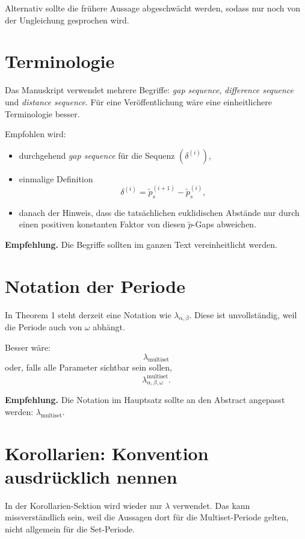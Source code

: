 \documentclass[11pt]{article}
\newcommand{\todo}[1]{\par\medskip\noindent\textbf{Empfehlung.} #1\par\medskip}
\begin{document}
Alternativ sollte die frühere Aussage abgeschwächt werden, sodass nur noch von der Ungleichung gesprochen wird.

\section{Terminologie}

Das Manuskript verwendet mehrere Begriffe: \emph{gap sequence}, \emph{difference sequence} und \emph{distance sequence}. Für eine Veröffentlichung wäre eine einheitlichere Terminologie besser.

Empfohlen wird:

\begin{itemize}[leftmargin=2em]
    \item durchgehend \emph{gap sequence} für die Sequenz \((\delta^{(i)})\),
    \item einmalige Definition
    \[
        \delta^{(i)}=\tilde p_s^{(i+1)}-\tilde p_s^{(i)},
    \]
    \item danach der Hinweis, dass die tatsächlichen euklidischen Abstände nur durch einen positiven konstanten Faktor von diesen \(\tilde p\)-Gaps abweichen.
\end{itemize}

\todo{Die Begriffe sollten im ganzen Text vereinheitlicht werden.}

\section{Notation der Periode}

In Theorem 1 steht derzeit eine Notation wie \(\lambda_{\alpha,\beta}\). Diese ist unvollständig, weil die Periode auch von \(\omega\) abhängt.

Besser wäre:
\[
    \lambda_{\mathrm{multiset}}
\]
oder, falls alle Parameter sichtbar sein sollen,
\[
    \lambda^{\mathrm{multiset}}_{\alpha,\beta,\omega}.
\]

\todo{Die Notation im Hauptsatz sollte an den Abstract angepasst werden: \(\lambda_{\mathrm{multiset}}\).}

\section{Korollarien: Konvention ausdrücklich nennen}

In der Korollarien-Sektion wird wieder nur \(\lambda\) verwendet. Das kann missverständlich sein, weil die Aussagen dort für die Multiset-Periode gelten, nicht allgemein für die Set-Periode.
\end{document}
